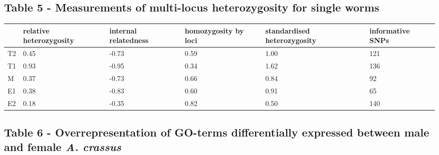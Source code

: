 \documentclass[10pt]{bmc_article}
\newenvironment{bmcformat}{\begin{raggedright}\baselineskip20pt\sloppy\setboolean{publ}{false}}{\end{raggedright}\baselineskip20pt\sloppy}
\begin{document}
\begin{bmcformat}
\subsection*{Table 5 - Measurements of multi-locus heterozygosity for
  single worms}

\begin{table}[ht]
\begin{center}
\begin{tabular}{p{2.5cm}p{2cm}p{2cm}p{2cm}p{2cm}p{2cm}}
  \hline
 & relative heterozygosity & internal relatedness & homozygosity by loci & standardised heterozygosity & informative SNPs \\ 
  \hline
T2 & 0.45 & -0.73 & 0.59 & 1.00 & 121 \\ 
  T1 & 0.93 & -0.95 & 0.34 & 1.62 & 136 \\ 
  M & 0.37 & -0.73 & 0.66 & 0.84 & 92 \\ 
  E1 & 0.38 & -0.83 & 0.60 & 0.91 & 65 \\ 
  E2 & 0.18 & -0.35 & 0.82 & 0.50 & 140 \\ 
   \hline
\end{tabular}
\end{center}
\end{table}
\newpage

\subsection*{Table 6 - Overrepresentation of GO-terms differentially
  expressed between male and female \textit{A. crassus}}


\end{bmcformat}
\end{document}
